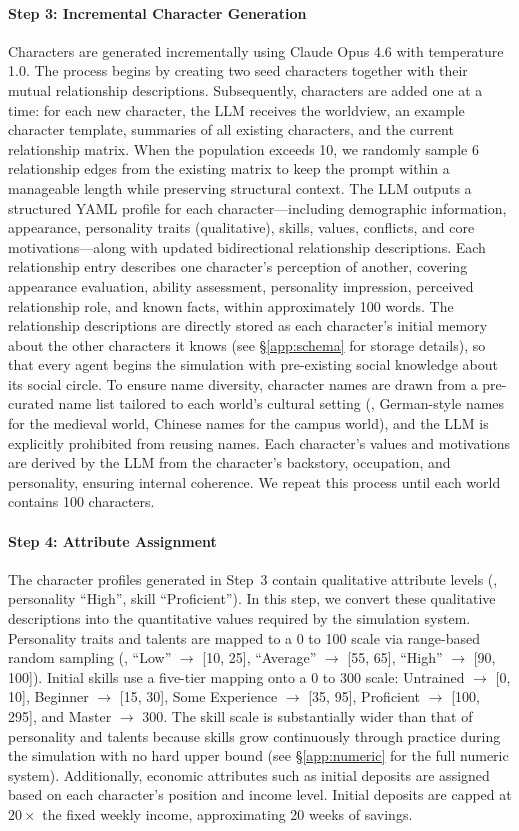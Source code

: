 \paragraph{Step 3: Incremental Character Generation}
Characters are generated incrementally using Claude Opus 4.6 with temperature 1.0.
The process begins by creating two seed characters together with their mutual relationship descriptions.
Subsequently, characters are added one at a time: for each new character, the LLM receives the worldview, an example character template, summaries of all existing characters, and the current relationship matrix.
When the population exceeds 10, we randomly sample 6 relationship edges from the existing matrix to keep the prompt within a manageable length while preserving structural context.
The LLM outputs a structured YAML profile for each character---including demographic information, appearance, personality traits (qualitative), skills, values, conflicts, and core motivations---along with updated bidirectional relationship descriptions.
Each relationship entry describes one character's perception of another, covering appearance evaluation, ability assessment, personality impression, perceived relationship role, and known facts, within approximately 100 words.
The relationship descriptions are directly stored as each character's initial memory about the other characters it knows
(see \S\ref{app:schema} for storage details),
so that every agent begins the simulation with pre-existing social knowledge about its social circle.
To ensure name diversity, character names are drawn from a pre-curated name list tailored to each world's cultural setting (\eg, German-style names for the medieval world, Chinese names for the campus world), and the LLM is explicitly prohibited from reusing names.
Each character's values and motivations are derived by the LLM from the character's backstory, occupation, and personality, ensuring internal coherence.
We repeat this process until each world contains 100 characters.

\paragraph{Step 4: Attribute Assignment}
The character profiles generated in Step~3 contain qualitative attribute levels (\eg, personality ``High'', skill ``Proficient'').
In this step, we convert these qualitative descriptions into the quantitative values required by the simulation system.
Personality traits and talents are mapped to a 0 to 100 scale via range-based random sampling
(\eg, ``Low'' $\to$ [10, 25], ``Average'' $\to$ [55, 65], ``High'' $\to$ [90, 100]).
Initial skills use a five-tier mapping onto a 0 to 300 scale:
Untrained $\to$ [0, 10], Beginner $\to$ [15, 30], Some Experience $\to$ [35, 95], Proficient $\to$ [100, 295], and Master $\to$ 300.
The skill scale is substantially wider than that of personality and talents because skills grow continuously through practice during the simulation with no hard upper bound
(see \S\ref{app:numeric} for the full numeric system).
Additionally, economic attributes such as initial deposits are assigned based on each character's position and income level.
Initial deposits are capped at $20\times$ the fixed weekly income, approximating 20 weeks of savings.

